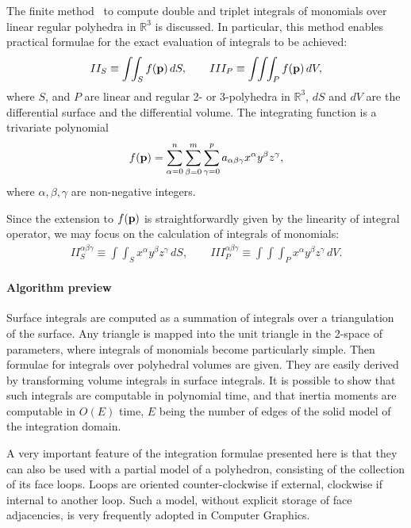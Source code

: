 \documentclass[11pt,oneside]{article}	%
\def\R{\mathbb{R}}
\def\vint{\int\!\!\int\!\!\int}
\def\sint{\int\!\!\int}
\def\asum{\sum_{\alpha=0}^n}
\def\bsum{\sum_{\beta=0}^m}
\def\csum{\sum_{\gamma=0}^p}
\begin{document}
The finite method~\cite{CattaniP-BIL1990} to compute double and triplet integrals
of monomials over linear regular polyhedra in $\R^3$ is discussed. 
In particular, this method enables practical formulae for the
exact evaluation of integrals to be achieved:
\begin{eqnarray}
II_{S} \equiv  \sint_{S} f({\bf p})\,dS, \qquad
III_{P} \equiv  \vint_{P} f({\bf p})\,dV,\label{2} 
\end{eqnarray}
where $S$, and $P$ are linear and regular 2- or 3-polyhedra in $\R^3$,
$dS$ and $dV$ are the differential surface
and the differential volume.  The integrating function 
is a  trivariate polynomial  
\[ 
f({\bf p})
=
\asum\bsum\csum
a_{\alpha\beta\gamma} x^\alpha y^\beta z^\gamma,
\] 
where $\alpha,\beta,\gamma$ are non-negative integers.

Since the extension to $f({\bf p})$ is straightforwardly given by the
linearity of integral operator, we may focus on the calculation of
integrals of monomials:
\begin{eqnarray}
II_{S}^{\alpha\beta\gamma} \equiv  
\sint_{S} x^\alpha y^\beta z^\gamma \,dS,\qquad
III_{P}^{\alpha\beta\gamma} \equiv 
\vint_{P} x^\alpha y^\beta z^\gamma \,dV.
\label{7} 
\end{eqnarray}


\paragraph{Algorithm preview}

Surface integrals are computed as a summation of integrals over a 
triangulation of the surface.  Any triangle is mapped into the unit 
triangle in the 2-space of parameters, where integrals 
of monomials become particularly 
simple.  Then formulae for integrals over polyhedral volumes are 
given.  They are easily derived by transforming volume integrals in 
surface integrals.  It is possible to show that such integrals are 
computable in polynomial time, and that inertia moments are computable 
in $O(E)$ time, $E$ being the number of edges of the solid model of 
the integration domain.

A very important feature of the integration formulae presented here is
that they can also be used with a partial model of a polyhedron,
consisting of the collection of its face loops.  Loops are oriented
counter-clockwise if external, clockwise if internal to another loop. 
Such a  model, without explicit storage of face adjacencies, is
very frequently adopted in Computer Graphics.
\end{document}
